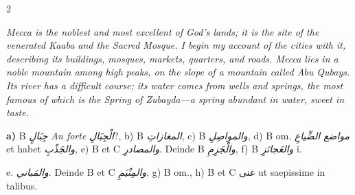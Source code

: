 \documentclass[11pt,a4paper]{article}
\begin{document}
\begin{paracol}{2}

\switchcolumn[0]
\begin{flushright}
{\small\arabicfont
{}}
\end{flushright}

\switchcolumn[1]
\begin{flushleft}
\small
\textit{Mecca is the noblest and most excellent of God's lands; it is the site of the venerated Kaaba and the Sacred Mosque. I begin my account of the cities with it, describing its buildings, mosques, markets, quarters, and roads. Mecca lies in a noble mountain among high peaks, on the slope of a mountain called Abu Qubays. Its river has a difficult course; its water comes from wells and springs, the most famous of which is the Spring of Zubayda---a spring abundant in water, sweet in taste.}
\end{flushleft}

\end{paracol}

\vspace{0.3cm}

\begin{footnotesize}
\noindent\textbf{a)} B \textit{جِبَالٍ} \textit{An forte} \textit{الْجِبَالِ}?, b) B \textit{المغازاتِ}, c) B \textit{والمواصِلِ}, d) B om. \textit{مواضع الضِّياعِ} et habet \textit{والجَذْبِ}, e) B et C \textit{والمصادرِ}. Deinde B \textit{والْجَزِمِ}, f) B \textit{والعَجائزِ} i.

e. \textit{والمَباني}. Deinde B et C \textit{والمِنْيَمِ}, g) B om., h) B et C غنى ut saepissime in talibus.
\end{footnotesize}

\clearpage

\end{document}
